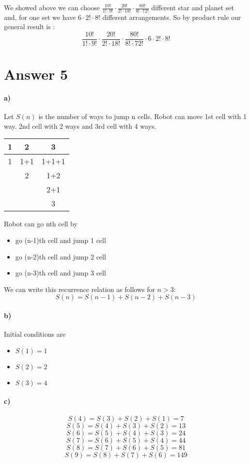 \documentclass[12pt]{article}
\begin{document}
We showed above we can choose $\frac{10!}{1!\cdot9!} \cdot \frac{20!}{2!\cdot18!} \cdot \frac{80!}{8!\cdot72!}$ different star and planet set and, for one set we have $6\cdot2!\cdot8!$ different arrangements. So by product rule our general result is :
$$\dfrac{10!}{1!\cdot9!} \cdot \dfrac{20!}{2!\cdot18!} \cdot \dfrac{80!}{8!\cdot72!} \cdot 6\cdot2!\cdot8!$$
\pagebreak
\section*{Answer 5}
\paragraph{a)} Let $S(n)$ is the number of ways to jump n cells. Robot can move 1st cell with 1 way. 2nd cell with 2 ways and 3rd cell with 4 ways.
\begin{center}
    \begin{tabular}{c|c|c}
        1 & 2 & 3\\
        \hline
        1 & 1+1 & 1+1+1 \\
        &2& 1+2 \\
        && 2+1\\
        && 3
    \end{tabular}
\end{center}
Robot can go nth cell by 
\begin{itemize}
    \item go (n-1)th cell and jump 1 cell
    \item go (n-2)th cell and jump 2 cell
    \item go (n-3)th cell and jump 3 cell
\end{itemize}
We can write this recurrence relation as follows for $ n >3 $: $$S(n) = S(n-1) + S(n-2) + S(n-3)$$
\paragraph{b)} Initial conditions are
\begin{itemize}
    \item $S(1) = 1$
    \item $S(2) = 2$
    \item $S(3) = 4$
\end{itemize}
\paragraph{c)}
$$S(4) = S(3) + S(2) + S(1) = 7$$
$$S(5) = S(4) + S(3) + S(2) = 13$$
$$S(6) = S(5) + S(4) + S(3) = 24$$
$$S(7) = S(6) + S(5) + S(4) = 44$$
$$S(8) = S(7) + S(6) + S(5) = 81$$
$$S(9) = S(8) + S(7) + S(6) = 149$$
\end{document}
